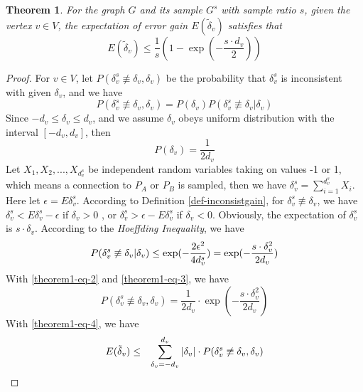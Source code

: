 \documentclass{sig-alternate-2013}
\begin{document}
\newtheorem{theorem}{Theorem}
\begin{theorem}\label{theorem-partition-error-a-vertex}
For the graph $G$ and its sample $G^s$ with sample ratio $s$, given the vertex $v \in V$, the expectation of error gain $E(\tilde\delta_v)$  satisfies that
\begin{equation}\label{theorem1-eq-0}
E(\tilde\delta_v) \leq \frac{1}{s} (1-\exp(-\frac{s\cdot d_v}{2}))
\end{equation}
\end{theorem}
\begin{proof}
For $v \in V$, let $P(\delta_v^s \not\equiv \delta_v, \delta_v)$ be the probability that $\delta_v^s$ is inconsistent with given $\delta_v$, and we have
\begin{equation}\label{theorem1-eq-1}
P( \delta_v^s \not\equiv \delta_v, \delta_v) = P(\delta_v)P(\delta_v^s \not\equiv \delta_v |\delta_v)
\end{equation}
Since $-d_v\leq\delta_v\leq d_v$, and we assume $\delta_v$ obeys uniform distribution with the interval $[-d_v, d_v]$, then
\begin{equation}\label{theorem1-eq-2}
P(\delta_v)=\frac{1}{2d_v}
\end{equation}
Let $X_1, X_2,...,X_{d_v^s}$ be independent random variables taking on values -1 or 1, which means a connection to $P_A$ or $P_B$ is sampled, then we have $\delta_v^s = \sum_{i=1}^{d_v^s} X_i$. Here let $\epsilon = E\delta_v^s$.
According to Definition \ref{def-inconsistgain}, for $ \delta_v^s \not\equiv \delta_v$, we have $\delta_v^s < E\delta_v^s - \epsilon$ if $\delta_v > 0 $ , or $\delta_v^s > \epsilon - E\delta_v^s$ if $\delta_v < 0$.
Obviously, the expectation of $\delta_v^s$ is $s\cdot \delta_v$. According to the \textit{Hoeffding Inequality}, we have
\begin{equation}\label{theorem1-eq-3}
P(\delta_v^s \not\equiv \delta_v | \delta_v)  \leq  \exp(-\frac{2\epsilon^2}{4d_v^s}) \\
 = \exp(-\frac{s\cdot \delta_v^2}{2d_v})
\end{equation}
With \eqref{theorem1-eq-2} and \eqref{theorem1-eq-3}, we have
\begin{equation}\label{theorem1-eq-4}
P( \delta_v^s \not\equiv \delta_v, \delta_v) = \frac{1}{2d_v} \cdot \exp(-\frac{s\cdot \delta_v^2}{2d_v})
\end{equation}
With \eqref{theorem1-eq-4}, we have
\begin{eqnarray}\label{theorem1-eq-5}
E(\tilde\delta_v) &\leq& \sum_{\delta_v=-d_v}^{d_v} {|\delta_v| \cdot P( \delta_v^s \not\equiv \delta_v, \delta_v) } \notag \\

\end{eqnarray}
\end{proof}
\end{document}
